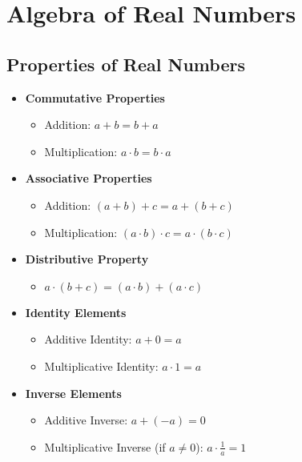 \chapter{Algebra of Real Numbers}
\author{Nithin}

\section{Properties of Real Numbers}
\begin{itemize}
    \item \textbf{Commutative Properties}
    \begin{itemize}
        \item Addition: $a + b = b + a$
        \item Multiplication: $a \cdot b = b \cdot a$
    \end{itemize}
    \vspace{5pt}

    \item \textbf{Associative Properties}
    \begin{itemize}
        \item Addition: $(a + b) + c = a + (b + c)$
        \item Multiplication: $(a \cdot b) \cdot c = a \cdot (b \cdot c)$
    \end{itemize}
    \vspace{5pt}
    \item \textbf{Distributive Property}
    \begin{itemize}
        \item $a \cdot (b + c) = (a \cdot b) + (a \cdot c)$
    \end{itemize}
    \vspace{5pt}
    \item \textbf{Identity Elements}
    \begin{itemize}
        \item Additive Identity: $a + 0 = a$
        \item Multiplicative Identity: $a \cdot 1 = a$
    \end{itemize}
    \vspace{5pt}
    \item \textbf{Inverse Elements}
    \begin{itemize}
        \item Additive Inverse: $a + (-a) = 0$
        \item Multiplicative Inverse (if $a \neq 0$): $a \cdot \frac{1}{a} = 1$
    \end{itemize}
\end{itemize}

